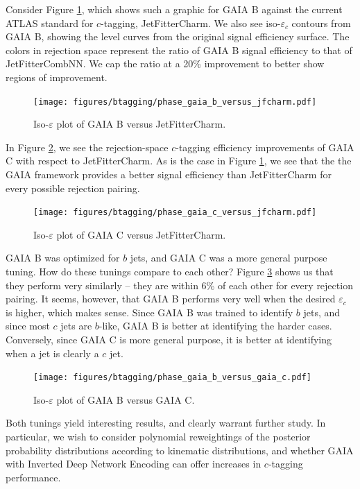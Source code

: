 Consider Figure \ref{fig:gbjfcphase}, which shows such a graphic for GAIA B against the current ATLAS standard for $c$-tagging, JetFitterCharm. We also see iso-$\varepsilon_c$ contours from GAIA B, showing the level curves from the original signal efficiency surface. The colors in rejection space represent the ratio of GAIA B signal efficiency to that of JetFitterCombNN. We cap the ratio at a 20\% improvement to better show regions of improvement. 

\begin{figure}[h!]
\texttt{[image: figures/btagging/phase\_gaia\_b\_versus\_jfcharm.pdf]}
\caption[The ATLAS detector]{Iso-$\varepsilon$ plot of GAIA B versus JetFitterCharm.
\label{fig:gbjfcphase}}
\end{figure}

In Figure \ref{fig:gcjfcphase}, we see the rejection-space $c$-tagging efficiency improvements of GAIA C with respect to JetFitterCharm. As is the case in Figure \ref{fig:gbjfcphase}, we see that the the GAIA framework provides a better signal efficiency than JetFitterCharm for every possible rejection pairing. 

\begin{figure}[h!]
\texttt{[image: figures/btagging/phase\_gaia\_c\_versus\_jfcharm.pdf]}
\caption[The ATLAS detector]{Iso-$\varepsilon$ plot of GAIA C versus JetFitterCharm.
\label{fig:gcjfcphase}}
\end{figure}


GAIA B was optimized for $b$ jets, and GAIA C was a more general purpose tuning. How do these tunings compare to each other? Figure \ref{fig:gbgcphase} shows us that they perform very similarly -- they are within 6\% of each other for every rejection pairing. It seems, however, that GAIA B performs very well when the desired $\varepsilon_c$ is higher, which makes sense. Since GAIA B was trained to identify $b$ jets, and since most $c$ jets are $b$-like, GAIA B is better at identifying the harder cases. Conversely, since GAIA C is more general purpose, it is better at identifying when a jet is clearly a $c$ jet. 

\begin{figure}[h!]
\texttt{[image: figures/btagging/phase\_gaia\_b\_versus\_gaia\_c.pdf]}
\caption[The ATLAS detector]{Iso-$\varepsilon$ plot of GAIA B versus GAIA C.
\label{fig:gbgcphase}}
\end{figure}

Both tunings yield interesting results, and clearly warrant further study. In particular, we wish to consider polynomial reweightings of the posterior probability distributions according to kinematic distributions, and whether GAIA with Inverted Deep Network Encoding can offer increases in $c$-tagging performance. 





















